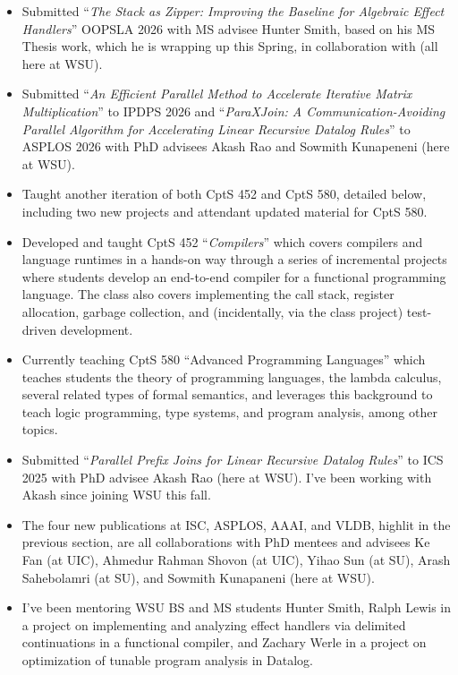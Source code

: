 \documentclass[line]{res}
\begin{document}
\begin{mycolorbox}
\begin{itemize}
\item Submitted ``\emph{The Stack as Zipper: Improving the Baseline for Algebraic Effect Handlers}'' OOPSLA 2026 with MS advisee Hunter Smith, based on his MS Thesis work, which he is wrapping up this Spring, in collaboration with (all here at WSU).
\item Submitted ``\emph{An Efficient Parallel Method to Accelerate Iterative Matrix Multiplication}'' to IPDPS 2026 and ``\emph{ParaXJoin: A Communication-Avoiding Parallel Algorithm for Accelerating Linear Recursive Datalog Rules}'' to ASPLOS 2026 with PhD advisees Akash Rao and Sowmith Kunapeneni (here at WSU).
\item Taught another iteration of both CptS 452 and CptS 580, detailed below, including two new projects and attendant updated material for CptS 580.
\end{itemize}
\end{mycolorbox}
\begin{itemize}
  \item Developed and taught CptS 452 ``\emph{Compilers}'' which covers compilers and language runtimes in a hands-on way through a series of incremental projects where students develop an end-to-end compiler for a functional programming language. The class also covers implementing the call stack, register allocation, garbage collection, and (incidentally, via the class project) test-driven development.
  \item Currently teaching CptS 580 ``Advanced Programming Languages'' which teaches students the theory of programming languages, the lambda calculus, several related types of formal semantics, and leverages this background to teach logic programming, type systems, and program analysis, among other topics.
  \item Submitted ``\emph{Parallel Prefix Joins for Linear Recursive Datalog Rules}'' to ICS 2025 with PhD advisee Akash Rao (here at WSU). I've been working with Akash since joining WSU this fall.
  \item The four new publications at ISC, ASPLOS, AAAI, and VLDB, highlit in the previous section, are all collaborations with PhD mentees and advisees Ke Fan (at UIC), Ahmedur Rahman Shovon (at UIC), Yihao Sun (at SU), Arash Sahebolamri (at SU), and Sowmith Kunapaneni (here at WSU).
  \item I've been mentoring WSU BS and MS students Hunter Smith, Ralph Lewis in a project on implementing and analyzing effect handlers via delimited continuations in a functional compiler, and Zachary Werle in a project on optimization of tunable program analysis in Datalog.
\end{itemize}
\end{document}
